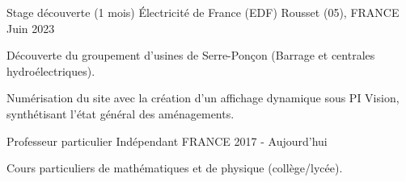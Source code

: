 

\begin{cventries}

  \cventry
    {Stage découverte (1 mois)} %
    {Électricité de France (EDF)} %
    {Rousset (05), FRANCE} %
    {Juin 2023} %
    {
      \begin{cvitems} %
        \item{Découverte du groupement d'usines de Serre-Ponçon (Barrage et centrales hydroélectriques).}
        \item{Numérisation du site avec la création d'un affichage dynamique sous PI Vision, synthétisant l'état général des aménagements.}
      \end{cvitems}
    }

  \cventry
    {Professeur particulier} %
    {Indépendant} %
    {FRANCE} %
    {2017 - Aujourd'hui} %
    {
      \begin{cvitems} %
        \item{Cours particuliers de mathématiques et de physique (collège/lycée).}
      \end{cvitems}
    }
    

\end{cventries}
